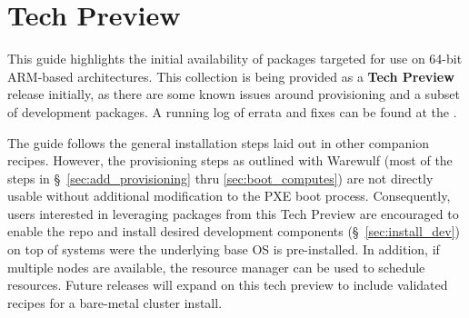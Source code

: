 \section{Tech Preview}

This guide highlights the initial availability of \OHPC{} packages targeted
for use on 64-bit ARM-based architectures. This collection is being provided as
a {\bf Tech Preview} release initially, as there are some known issues around
provisioning and a subset of development packages. A running log of errata and
fixes can be found at the
\href{https://github.com/openhpc/ohpc/wiki/ARM-Tech-Preview}{\color{blue}{ARM Tech Preview Wiki}}.

The guide follows the general installation steps laid out in other companion
\OHPC{} recipes.  However, the provisioning steps as outlined with Warewulf
(most of the steps in \S~\ref{sec:add_provisioning} thru
\ref{sec:boot_computes}) are not directly usable without additional
modification to the PXE boot process.  Consequently, users interested in
leveraging packages from this Tech Preview are encouraged to enable the repo and install desired development
components (\S~\ref{sec:install_dev}) on top of systems were the underlying
base OS is pre-installed. In addition, if multiple nodes are available, the
\rms{} resource manager can be used to schedule resources. Future \OHPC{} releases
will expand on this tech preview to include validated recipes for a bare-metal
cluster install. \\

